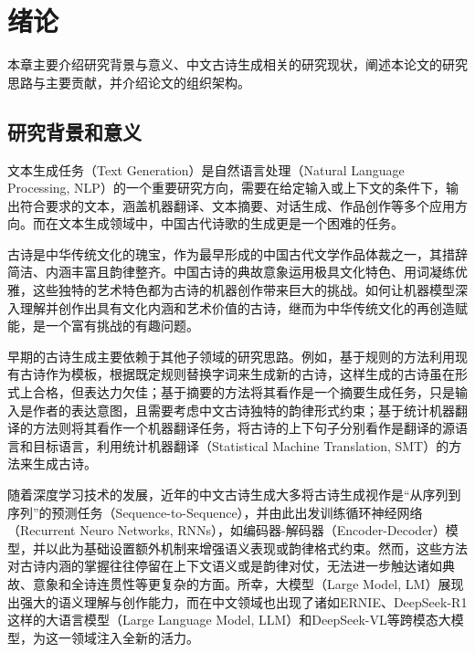 
\chapter{绪论}

本章主要介绍研究背景与意义、中文古诗生成相关的研究现状，阐述本论文的研究思路与主要贡献，并介绍论文的组织架构。

\section{研究背景和意义}

文本生成任务（Text Generation）是自然语言处理（Natural Language Processing, NLP）的一个重要研究方向，需要在给定输入或上下文的条件下，输出符合要求的文本，涵盖机器翻译、文本摘要、对话生成、作品创作等多个应用方向。而在文本生成领域中，中国古代诗歌的生成更是一个困难的任务。

古诗是中华传统文化的瑰宝，作为最早形成的中国古代文学作品体裁之一，其措辞简洁、内涵丰富且韵律整齐。中国古诗的典故意象运用极具文化特色、用词凝练优雅，这些独特的艺术特色都为古诗的机器创作带来巨大的挑战。如何让机器模型深入理解并创作出具有文化内涵和艺术价值的古诗，继而为中华传统文化的再创造赋能，是一个富有挑战的有趣问题。

早期的古诗生成主要依赖于其他子领域的研究思路。例如，基于规则的方法利用现有古诗作为模板，根据既定规则替换字词来生成新的古诗，这样生成的古诗虽在形式上合格，但表达力欠佳；基于摘要的方法将其看作是一个摘要生成任务，只是输入是作者的表达意图，且需要考虑中文古诗独特的韵律形式约束；基于统计机器翻译的方法则将其看作一个机器翻译任务，将古诗的上下句子分别看作是翻译的源语言和目标语言，利用统计机器翻译（Statistical Machine Translation, SMT）的方法来生成古诗。

随着深度学习技术的发展，近年的中文古诗生成大多将古诗生成视作是“从序列到序列”的预测任务（Sequence-to-Sequence），并由此出发训练循环神经网络（Recurrent Neuro Networks, RNNs），如编码器-解码器（Encoder-Decoder）模型，并以此为基础设置额外机制来增强语义表现或韵律格式约束。然而，这些方法对古诗内涵的掌握往往停留在上下文语义或是韵律对仗，无法进一步触达诸如典故、意象和全诗连贯性等更复杂的方面。所幸，大模型（Large Model, LM）展现出强大的语义理解与创作能力，而在中文领域也出现了诸如ERNIE、DeepSeek-R1这样的大语言模型（Large Language Model, LLM）和DeepSeek-VL等跨模态大模型，为这一领域注入全新的活力。

